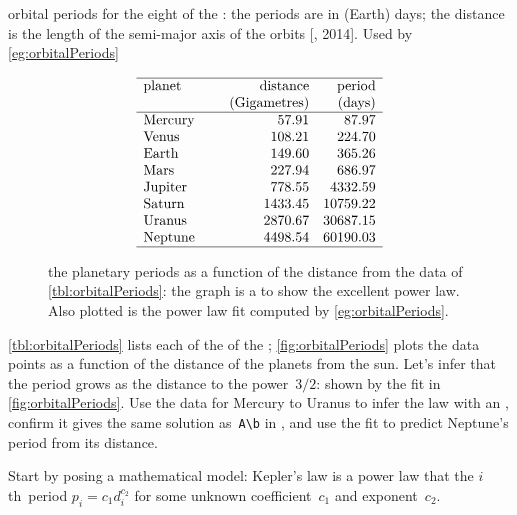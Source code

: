 \begin{example} \label{eg:orbitalPeriods}
\begin{table}
\caption{orbital periods for the eight  of the : the periods are in (Earth) days; the distance is the length of the semi-major axis of the orbits [, 2014].
Used by \autoref{eg:orbitalPeriods}}
\label{tbl:orbitalPeriods}
\begin{equation*}
\begin{array}{p{12ex}rr} \hline
planet&\text{distance}&\text{period}\\
&\text{(Gigametres)}&\text{(days)}\\\hline
Mercury& 57.91 & 87.97 \\
Venus& 108.21 & 224.70 \\
Earth& 149.60& 365.26\\
Mars& 227.94& 686.97\\
Jupiter& 778.55& 4332.59\\
Saturn& 1433.45& 10759.22\\
Uranus& 2870.67& 30687.15\\
Neptune& 4498.54& 60190.03\\\hline
\end{array}
\end{equation*}
\end{table}%
\begin{figure}
\centering

\caption{the planetary periods as a function of the distance from the data of \autoref{tbl:orbitalPeriods}: the graph is a  to show the excellent power law.  
Also plotted is the power law fit computed by \autoref{eg:orbitalPeriods}.}
\label{fig:orbitalPeriods}
\end{figure}%
\autoref{tbl:orbitalPeriods} lists each  of the  of the ; \autoref{fig:orbitalPeriods} plots the data points as a function of the distance of the planets from the sun.
Let's infer  that the period grows as the distance to the power~\(3/2\): shown by the  fit in \autoref{fig:orbitalPeriods}.
Use the data for Mercury to Uranus to infer the law with an \svd, confirm it gives the same solution as~\verb|A\b| in \script, and use the fit to predict Neptune's period from its distance.
\begin{solution} 
Start by posing a mathematical model: Kepler's law is a power law that the \(i\)th~period \(p_i=c_1d_i^{c_2}\) for some unknown coefficient~\(c_1\) and exponent~\(c_2\).  

\end{solution}
\end{example}
